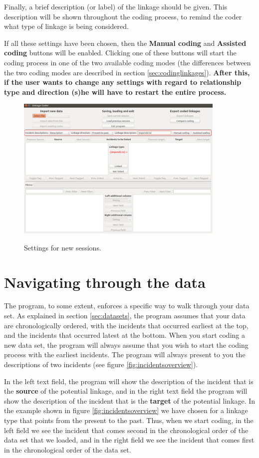 \documentclass{memoir}
\begin{document}
Finally, a brief description (or label) of the linkage should be given. This description will be shown throughout the coding process, to remind the coder what type of linkage is being considered.

If all these settings have been chosen, then the \textbf{Manual coding} and \textbf{Assisted coding} buttons will be enabled. Clicking one of these buttons will start the coding process in one of the two available coding modes (the differences between the two coding modes are described in section \ref{sec:codinglinkages}). \textbf{After this, if the user wants to change any settings with regard to relationship type and direction (s)he will have to restart the entire process.}

\begin{figure}[h!]
  \centering
  \caption{Settings for new sessions.}
  \includegraphics[width=100mm]{Screenshot_4.pdf}
  \label{fig:settings}
\end{figure}

\section{Navigating through the data}
\label{sec:navigatingdata}

The program, to some extent, enforces a specific way to walk through your data set. As explained in section \ref{sec:datasets}, the program assumes that your data are chronologically ordered, with the incidents that occurred earliest at the top, and the incidents that occurred latest at the bottom. When you start coding a new data set, the program will always assume that you wish to start the coding process with the earliest incidents. The program will always present to you the descriptions of two incidents (see figure \ref{fig:incidentsoverview}).

In the left text field, the program will show the description of the incident that is the \textbf{source} of the potential linkage, and in the right text field the program will show the description of the incident that is the \textbf{target} of the potential linkage. In the example shown in figure \ref{fig:incidentsoverview} we have chosen for a linkage type that points from the present to the past. Thus, when we start coding, in the left field we see the incident that comes second in the chronological order of the data set that we loaded, and in the right field we see the incident that comes first in the chronological order of the data set.
\end{document}
